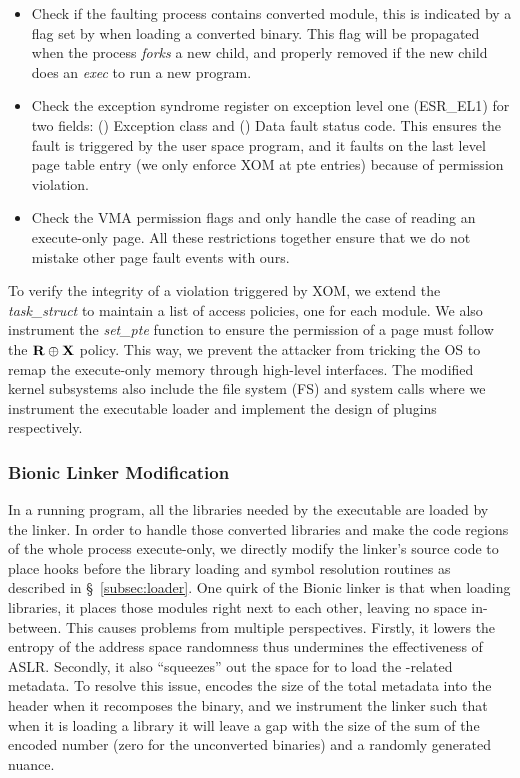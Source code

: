\begin{itemize}
	\item Check if the faulting process contains \NORAX converted module, this is indicated by a flag set by \emph{\NLoader} when loading a converted binary. This flag will be propagated when the process \emph{forks} a new child, and properly removed if the new child does an \emph{exec} to run a new program.
	\item Check the exception syndrome register on exception level one (ESR\_EL1\cite{esrinterp}) for two fields: {()} Exception class and {()} Data fault status code. This ensures the fault is triggered by the user space program, and it faults on the last level page table entry (we only enforce XOM at pte entries) because of permission violation.
	\item Check the VMA permission flags and only handle the case of reading an execute-only page. All these restrictions together ensure that we do not mistake other page fault events with ours.
\end{itemize}



To verify the integrity of a violation triggered by XOM, we extend the \emph{task\_struct} to maintain a list of access policies, one for each module.
We also instrument the \emph{set\_pte} function to ensure the permission of a page must follow the $\bf{R}\oplus\bf{X}$ policy. This way, we prevent the attacker from tricking the OS to remap the execute-only memory through high-level interfaces. 
The modified kernel subsystems also include the file system (FS) and system calls where we instrument the executable loader and implement the design of \emph{\NLoader} plugins respectively.

 
\subsubsection{Bionic Linker Modification}
In a running program, all the libraries needed by the executable are loaded by the linker. In order to handle those converted libraries and make the code regions of the whole process execute-only, we directly modify the linker's source code to place hooks before the library loading and symbol resolution routines as described in \S~\ref{subsec:loader}. One quirk of the Bionic linker is that when loading libraries, it places those modules right next to each other, leaving no space in-between. This causes problems from multiple perspectives. Firstly, it lowers the entropy of the address space randomness thus undermines the effectiveness of ASLR. Secondly, it also ``squeezes'' out the space for \emph{\NLoader} to load the \NORAX-related metadata. To resolve this issue, \emph{\NPatcher} encodes the size of the total metadata into the \NORAX header when it recomposes the binary, and we instrument the linker such that when it is loading a library it will leave a gap with the size of the sum of the encoded number (zero for the unconverted binaries) and a randomly generated nuance.



